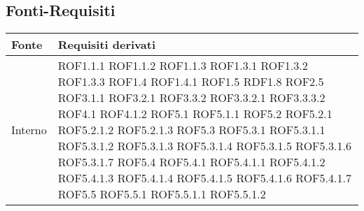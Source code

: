 \subsection{Fonti-Requisiti} %
\label{ssub:fonti_requisiti}
\begin{center}
\def\arraystretch{1.5}
\bgroup
\begin{longtable}{| p{4cm} | p{4cm} |}
\hline
\textbf{Fonte} & \textbf{Requisiti derivati} \\
\hline
Interno & ROF1.1.1 \newline ROF1.1.2 \newline ROF1.1.3 \newline ROF1.3.1 \newline ROF1.3.2 \newline ROF1.3.3 \newline ROF1.4 \newline ROF1.4.1 \newline ROF1.5 \newline RDF1.8 \newline ROF2.5 \newline ROF3.1.1 \newline ROF3.2.1 \newline ROF3.3.2 \newline ROF3.3.2.1 \newline ROF3.3.3.2 \newline ROF4.1 \newline ROF4.1.2 \newline ROF5.1 \newline ROF5.1.1 \newline ROF5.2 \newline ROF5.2.1 \newline ROF5.2.1.2 \newline ROF5.2.1.3 \newline ROF5.3 \newline ROF5.3.1 \newline ROF5.3.1.1 \newline ROF5.3.1.2 \newline ROF5.3.1.3 \newline ROF5.3.1.4 \newline ROF5.3.1.5 \newline ROF5.3.1.6 \newline ROF5.3.1.7 \newline ROF5.4 \newline ROF5.4.1 \newline ROF5.4.1.1 \newline ROF5.4.1.2 \newline ROF5.4.1.3 \newline ROF5.4.1.4 \newline ROF5.4.1.5 \newline ROF5.4.1.6 \newline ROF5.4.1.7 \newline ROF5.5 \newline ROF5.5.1 \newline ROF5.5.1.1 \newline ROF5.5.1.2 \\

\end{longtable}
\end{center}
